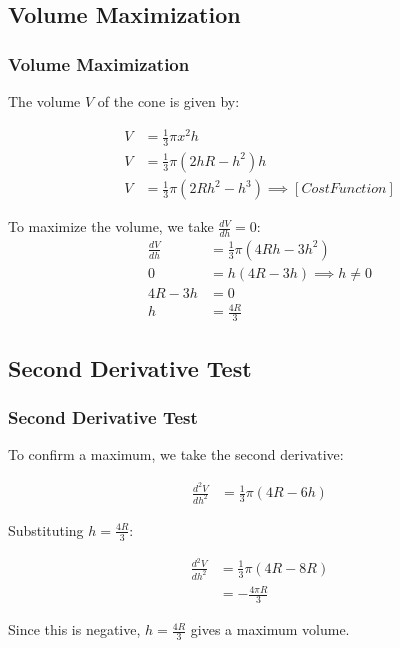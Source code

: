 \documentclass{beamer}
\providecommand{\sbrak}[1]{\ensuremath{{}\left[#1\right]}}
\numberwithin{equation}{section}
\begin{document}
\subsection{Volume Maximization}
\begin{frame}
\frametitle{Volume Maximization}
The volume $V$ of the cone is given by:

\begin{align}
V &= \frac{1}{3} \pi x^2 h \\
V &= \frac{1}{3} \pi (2hR - h^2) h \\
	V &= \frac{1}{3} \pi (2Rh^2 - h^3)   \implies \sbrak{ Cost Function}
\end{align}

To maximize the volume, we take $\frac{dV}{dh} = 0$:
\begin{align}
\frac{dV}{dh} &= \frac{1}{3} \pi (4Rh - 3h^2) \\
0 &= h(4R - 3h) \implies h \neq 0\\
4R - 3h &= 0 \\
h &= \frac{4R}{3}
\end{align}
\end{frame}

\subsection{Second Derivative Test}
\begin{frame}
\frametitle{Second Derivative Test}
To confirm a maximum, we take the second derivative:

\begin{align}
\frac{d^2V}{dh^2} &= \frac{1}{3} \pi (4R - 6h)
\end{align}

Substituting $h = \frac{4R}{3}$:

\begin{align}
\frac{d^2V}{dh^2} &= \frac{1}{3} \pi (4R - 8R) \\
&= -\frac{4\pi R}{3}
\end{align}

Since this is negative, $h = \frac{4R}{3}$ gives a maximum volume.
\end{frame}
\end{document}
